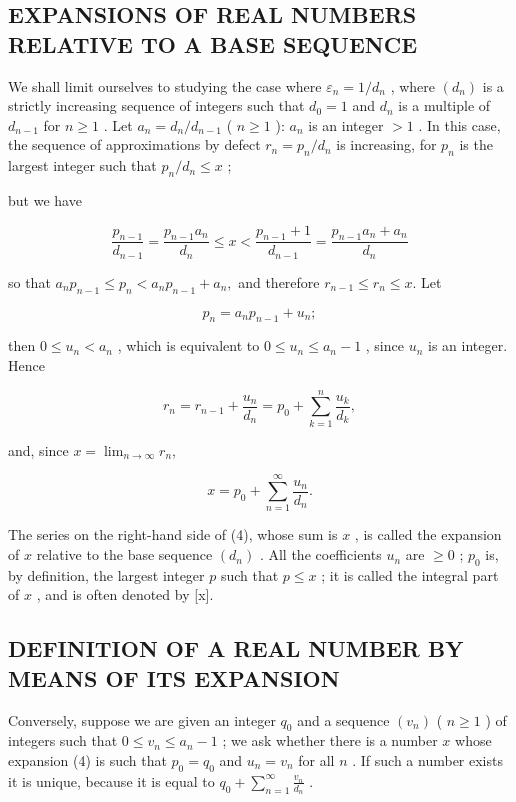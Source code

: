 \subsection{EXPANSIONS OF REAL NUMBERS RELATIVE TO A BASE SEQUENCE}

We shall limit ourselves to studying the case where \(\varepsilon_{n} = 1 / d_{n}\) , where \((d_n)\) is a strictly increasing sequence of integers such that \(d_0 = 1\) and \(d_n\) is a multiple of \(d_{n-1}\) for \(n \geqslant 1\) . Let \(a_n = d_n / d_{n-1}\) ( \(n \geqslant 1\) ): \(a_n\) is an integer \(>1\) . In this case, the sequence of approximations by defect \(r_n = p_n / d_n\) is increasing, for \(p_n\) is the largest integer such that \(p_n / d_n \leqslant x\) ;

but we have

\[
\frac {p _ {n - 1}}{d _ {n - 1}} = \frac {p _ {n - 1} a _ {n}}{d _ {n}} \leqslant x <   \frac {p _ {n - 1} + 1}{d _ {n - 1}} = \frac {p _ {n - 1} a _ {n} + a _ {n}}{d _ {n}}
\]

so that \(a_{n}p_{n - 1}\leqslant p_{n} <   a_{n}p_{n - 1} + a_{n},\) and therefore \(r_{n - 1}\leqslant r_n\leqslant x.\) Let

\[
p _ {n} = a _ {n} p _ {n - 1} + u _ {n};\tag{2}
\]

then \(0 \leqslant u_n < a_n\) , which is equivalent to \(0 \leqslant u_n \leqslant a_n - 1\) , since \(u_n\) is an integer. Hence

\[
r _ {n} = r _ {n - 1} + \frac {u _ {n}}{d _ {n}} = p _ {0} + \sum_ {k = 1} ^ {n} \frac {u _ {k}}{d _ {k}},\tag{3}
\]

and, since \(x = \lim_{n\to \infty}r_n,\)

\[
x = p _ {0} + \sum_ {n = 1} ^ {\infty} \frac {u _ {n}}{d _ {n}}.\tag{4}
\]

The series on the right-hand side of (4), whose sum is \(x\) , is called the expansion of \(x\) relative to the base sequence \((d_n)\) . All the coefficients \(u_n\) are \(\geqslant 0\) ; \(p_0\) is, by definition, the largest integer \(p\) such that \(p \leqslant x\) ; it is called the integral part of \(x\) , and is often denoted by {[}x{]}.

\subsection{DEFINITION OF A REAL NUMBER BY MEANS OF ITS EXPANSION}

Conversely, suppose we are given an integer \(q_0\) and a sequence \((v_n)\) ( \(n \geqslant 1\) ) of integers such that \(0 \leqslant v_n \leqslant a_n - 1\) ; we ask whether there is a number \(x\) whose expansion (4) is such that \(p_0 = q_0\) and \(u_n = v_n\) for all \(n\) . If such a number exists it is unique, because it is equal to \(q_0 + \sum_{n=1}^{\infty} \frac{v_n}{d_n}\) .

